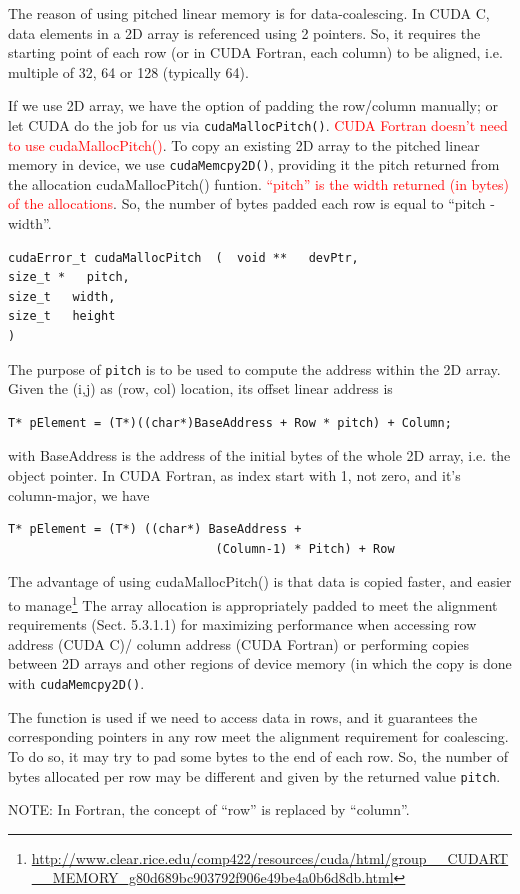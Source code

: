 The reason of using pitched linear memory is for data-coalescing. In CUDA C,
data elements in a 2D array is referenced using 2 pointers. So, it requires the
starting point of each row (or in CUDA Fortran, each column) to be aligned, i.e.
multiple of 32, 64 or 128 (typically 64). 

If we use 2D array, we have the option of padding the row/column manually; or
let CUDA do the job for us via \verb!cudaMallocPitch()!. \textcolor{red}{CUDA
Fortran doesn't need to use cudaMallocPitch()}. To copy an existing 2D array
to the pitched linear memory in device, we use \verb!cudaMemcpy2D()!, providing
it the pitch returned from the allocation cudaMallocPitch() funtion.
\textcolor{red}{``pitch'' is the width returned (in bytes) of the allocations}.
So, the number of bytes padded each row is equal to ``pitch - width''.


\begin{lstlisting}
cudaError_t cudaMallocPitch  (  void **   devPtr,
size_t *   pitch,
size_t   width,
size_t   height   
)  
\end{lstlisting}
The purpose of \verb!pitch! is to be used to compute the address within the 2D
array. Given the (i,j) as (row, col) location, its offset linear address is
\begin{verbatim}
T* pElement = (T*)((char*)BaseAddress + Row * pitch) + Column;
\end{verbatim}
with BaseAddress is the address of the initial bytes of the whole
    2D array, i.e. the object pointer. 
    In CUDA Fortran, as index start with 1, not zero, and it's
    column-major, we have
\begin{lstlisting}
T* pElement = (T*) ((char*) BaseAddress + 
                             (Column-1) * Pitch) + Row
\end{lstlisting}

\begin{framed}
The advantage of using cudaMallocPitch() is that data is copied faster, and
easier to
manage\footnote{\url{http://www.clear.rice.edu/comp422/resources/cuda/html/group__CUDART__MEMORY_g80d689bc903792f906e49be4a0b6d8db.html}}
The array allocation is appropriately padded to
meet the alignment requirements (Sect. 5.3.1.1) for maximizing performance when accessing row address (CUDA
  C)/ column address (CUDA Fortran) or performing copies between 2D arrays and
  other regions of device memory (in which the copy is done with
  \verb!cudaMemcpy2D()!.

The function is used if we need to access data in rows, and it guarantees
    the corresponding pointers in any row meet the alignment requirement for
    coalescing. To do so, it may try to pad some bytes to the end of each row.
    So, the number of bytes allocated per row may be different and given by the
    returned value \verb!pitch!.

    NOTE: In Fortran, the concept of ``row'' is replaced by
    ``column''.

\end{framed}

